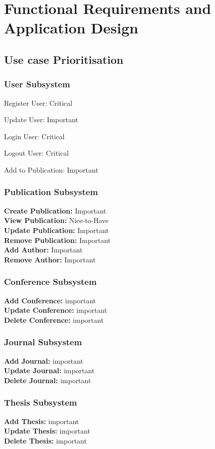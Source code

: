 \documentclass{article}
\begin{document}
		
	
	\section{Functional Requirements and Application Design}
		\subsection{Use case Prioritisation}
			\subsubsection{User Subsystem}
				Register User: Critical\par
				Update User: Important\par
				Login User: Critical\par
				Logout User: Critical\par
				Add to Publication: Important
			\subsubsection{Publication Subsystem}
			\textbf{Create Publication:} Important\\
			\textbf{View Publication:} Nice-to-Have\\
			\textbf{Update Publication:} Important\\
			\textbf{Remove Publication:} Important\\
			\textbf{Add Author:} Important\\
			\textbf{Remove Author:} Important\\
			\subsubsection{Conference Subsystem}
				\textbf{Add Conference:} important\\
				\textbf{Update Conference:} important\\
				\textbf{Delete Conference:} important
			\subsubsection{Journal Subsystem}
				\textbf{Add Journal:} important\\
				\textbf{Update Journal:} important\\
				\textbf{Delete Journal:} important
			\subsubsection{Thesis Subsystem}
				\textbf{Add Thesis:} important\\
				\textbf{Update Thesis:} important\\
				\textbf{Delete Thesis:} important
\end{document}
